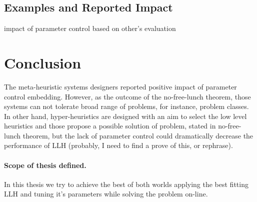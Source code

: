 \subsection{Examples and Reported Impact}
impact of parameter control based on other's evaluation


\section{Conclusion}

The meta-heuristic systems designers reported positive impact of parameter control embedding. 
However, as the outcome of the no-free-lunch theorem, those systems can not tolerate broad range of problems, for instance, problem classes.
In other hand, hyper-heuristics are designed with an aim to select the low level heuristics and those propose a possible solution of problem, stated in no-free-lunch theorem, but the lack of parameter control could dramatically decrease the performance of LLH (probably, I need to find a prove of this, or rephrase).

\paragraph{Scope of thesis defined.} In this thesis we try to achieve the best of both worlds applying the best fitting LLH and tuning it's parameters while solving the problem on-line.
